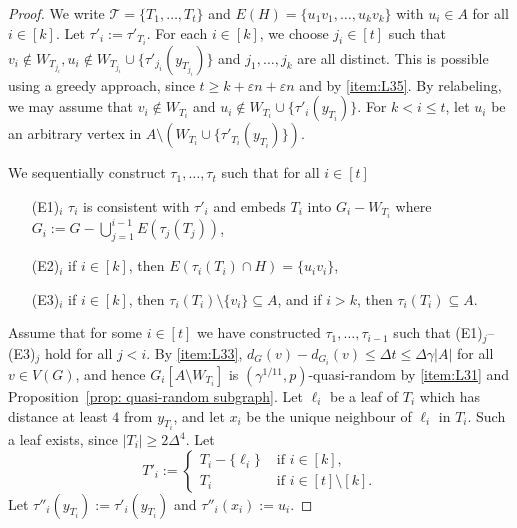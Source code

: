 \documentclass[a4paper, 11pt, reqno]{amsart}
\numberwithin{equation}{section}
\newcommand{\1}{{\rm 1\hspace*{-0.4ex}%
\rule{0.1ex}{1.52ex}\hspace*{0.2ex}}}
\newcommand{\cT}{\mathcal{T}}
\renewcommand{\epsilon}{\varepsilon}
\newcommand{\sm}{\setminus}
\newcommand{\sub}{\subseteq}
\begin{document}
\begin{proof}
We write $\cT=\{T_1,\ldots,T_t\}$ and
$E(H)=\{u_1v_1,\dots, u_k v_k\}$ with $u_i\in A$ for all $i\in [k]$. 
Let $\tau'_{i}:=\tau'_{T_i}$.
For each $i\in  [k]$, we choose $j_i\in[t]$ such that $v_i\notin W_{T_{j_i}}, u_i\notin W_{T_{j_i}}\cup \{ \tau'_{j_i}(y_{T_{j_i}})\}$ and $j_1,\dots, j_{k}$ are all distinct. 
This is possible using a greedy approach, since $t \geq k + \epsilon n + \epsilon n$ and by \ref{item:L35}. 
By relabeling, we may assume that $v_i\notin W_{T_i}$ and $u_i\notin W_{T_{i}}\cup \{ \tau'_{i}(y_{T_{i}})\}$. For $k< i \leq t$, let $u_i$ be an arbitrary vertex in $A\sm (W_{T_{i}}\cup \{\tau'_{T_{i}}(y_{T_i})\})$. 

We sequentially construct $\tau_1,\dots, \tau_{t}$
such that for all $i\in [t]$
 \begin{itemize}
 \item[(E1)$_i$] $\tau_i$ is consistent with $\tau'_i$ and embeds $T_i$ into $G_i- W_{T_i}$ where $G_i:= G- \bigcup_{j=1}^{i-1}E(\tau_{j}(T_j))$,
 \item[(E2)$_i$] if $i\in[k]$, then $E(\tau_i(T_i)\cap H) = \{u_iv_i\}$,
 \item[(E3)$_i$] if $i\in[k]$, then $\tau_i(T_i)\setminus \{v_i\}\subseteq A$, and
 if $i>k$, then $\tau_i(T_i)\sub A$.
 \end{itemize}

Assume that for some $i\in [t]$ we have constructed $\tau_1,\dots,\tau_{i-1}$ such that (E1)$_j$--(E3)$_j$ hold for all $j<i$. 
By \ref{item:L33}, $d_{G}(v)-d_{G_i}(v)\leq \Delta t\leq \Delta \gamma |A|$ for all $v\in V(G)$, 
and hence $G_i[A\sm W_{T_i}]$ is $(\gamma^{1/11},p)$-quasi-random by \ref{item:L31} and Proposition~\ref{prop: quasi-random subgraph}.
Let $\ell_i$ be a leaf of $T_i$ which has distance at least $4$ from $y_{T_i}$, and let $x_i$ be the unique neighbour of $\ell_i$ in $T_i$. 
Such a leaf exists, since $|T_i|\geq 2\Delta^4$. 
Let 
$$T'_i:=\left\{ \begin{array}{ll} T_i - \{\ell_i\} &\text{ if }i\in [k], \\
 T_i &\text{ if }i\in [t]\sm [k]. \end{array}\right.$$
Let $\tau''_i(y_{T_i}):=\tau'_{i}(y_{T_i})$ and $\tau''_i(x_i):=u_i$. 



\end{proof}
\end{document}
